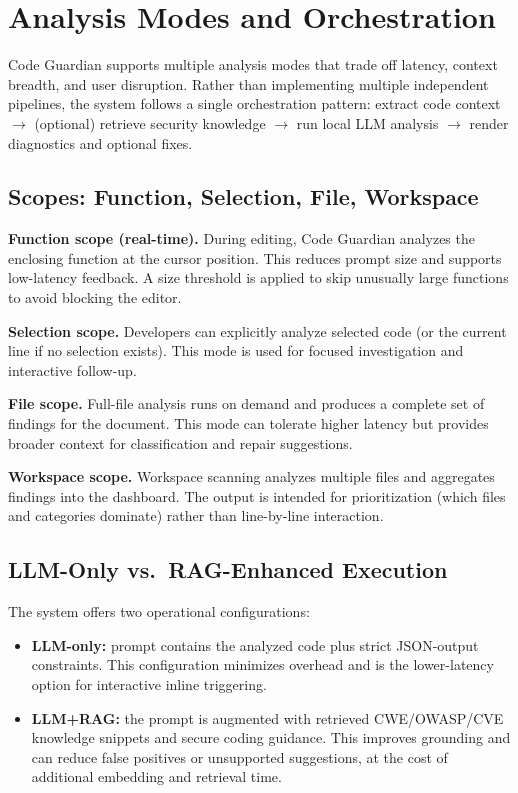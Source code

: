 \section{Analysis Modes and Orchestration}
\label{sec:impl-responsiveness}

Code Guardian supports multiple analysis modes that trade off latency, context breadth, and user disruption. Rather than implementing multiple independent pipelines, the system follows a single orchestration pattern: extract code context $\rightarrow$ (optional) retrieve security knowledge $\rightarrow$ run local LLM analysis $\rightarrow$ render diagnostics and optional fixes.

\subsection{Scopes: Function, Selection, File, Workspace}
\label{subsec:impl-scopes}

\textbf{Function scope (real-time).} During editing, Code Guardian analyzes the enclosing function at the cursor position. This reduces prompt size and supports low-latency feedback. A size threshold is applied to skip unusually large functions to avoid blocking the editor.

\textbf{Selection scope.} Developers can explicitly analyze selected code (or the current line if no selection exists). This mode is used for focused investigation and interactive follow-up.

\textbf{File scope.} Full-file analysis runs on demand and produces a complete set of findings for the document. This mode can tolerate higher latency but provides broader context for classification and repair suggestions.

\textbf{Workspace scope.} Workspace scanning analyzes multiple files and aggregates findings into the dashboard. The output is intended for prioritization (which files and categories dominate) rather than line-by-line interaction.

\subsection{LLM-Only vs.\ RAG-Enhanced Execution}
\label{subsec:impl-rag-toggle}

The system offers two operational configurations:
\begin{itemize}
  \item \textbf{LLM-only:} prompt contains the analyzed code plus strict JSON-output constraints. This configuration minimizes overhead and is the lower-latency option for interactive inline triggering.
  \item \textbf{LLM+RAG:} the prompt is augmented with retrieved CWE/OWASP/CVE knowledge snippets and secure coding guidance. This improves grounding and can reduce false positives or unsupported suggestions, at the cost of additional embedding and retrieval time.
\end{itemize}

